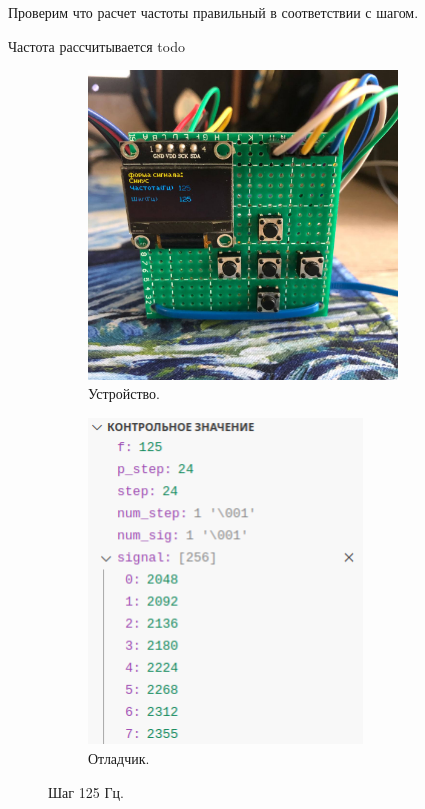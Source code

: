 	Проверим что расчет частоты правильный в соответствии с шагом.
	
	Частота рассчитывается todo
	
	\begin{figure}[H]
     \begin{subfigure}[H]{0.5\textwidth}
         \centering
         \includegraphics[width=0.9\textwidth]{../image/test1_u_f.jpg}
         \caption{Устройство.}
     \end{subfigure}
     \hfill
     \begin{subfigure}[H]{0.5\textwidth}
         \centering
         \includegraphics[width=0.8\textwidth]{../image/test1_o_f.png}
         \caption{Отладчик.}
     \end{subfigure}
        \caption{Шаг 125 Гц.}
	\end{figure}
	
